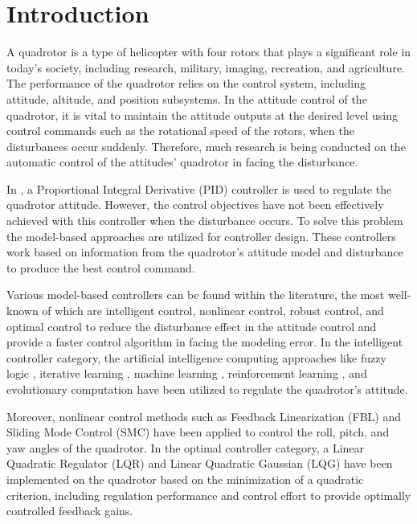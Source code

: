 \documentclass[conference]{IEEEtran}
\begin{document}
\section{Introduction}

\noindent A quadrotor is a type of helicopter with four rotors that plays a significant role in today's society, including research, military, imaging, recreation, and agriculture. The performance of the quadrotor relies on the control system, including attitude, altitude, and position subsystems. In the attitude control of the quadrotor, it is vital to maintain the attitude outputs at the desired level using control commands such as the rotational speed of the rotors, when the disturbances occur suddenly. Therefore, much research is being conducted on the automatic control of the attitudes' quadrotor in facing the disturbance.


     In \cite{PID}, a Proportional Integral Derivative (PID) controller is used to regulate the quadrotor attitude. However, the control objectives have not been effectively achieved with this controller when the disturbance occurs. To solve this problem the model-based approaches \cite{model_base} are utilized for controller design. These controllers work based on information from the quadrotor's attitude model and disturbance to produce the best control command.


     Various model-based controllers can be found within the literature, the most well-known of which are intelligent control, nonlinear control, robust control, and optimal control to reduce the disturbance effect in the attitude control and provide a faster control algorithm in facing the modeling error. In the intelligent controller category, the artificial intelligence computing approaches like fuzzy logic \cite{fuzzy}, iterative learning \cite{iterative_Learning}, machine learning \cite{machine_learning}, reinforcement learning \cite{Reinforcement_Learning}, and evolutionary computation \cite{Evolutionary} have been utilized to regulate the quadrotor's attitude.


     Moreover, nonlinear control methods such as  Feedback Linearization (FBL) \cite{FBL} and Sliding Mode Control (SMC) \cite{SMC} have been applied to control the roll, pitch, and yaw angles of the quadrotor. In the optimal controller category, a Linear Quadratic Regulator (LQR) \cite{LQR} and Linear Quadratic Gaussian (LQG) \cite{LQG} have been implemented on the quadrotor based on the minimization of a quadratic criterion, including regulation performance and control effort to provide optimally controlled feedback gains. 
\end{document}

